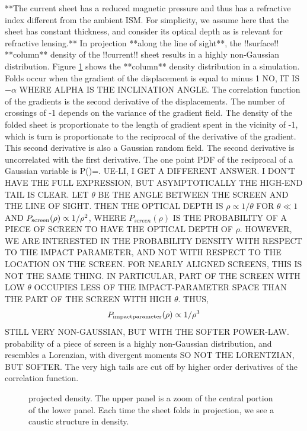 \documentclass[useAMS,usenatbib]{mn2e}
\begin{document}
**The current sheet has a reduced magnetic pressure and thus has a refractive index different
from the ambient ISM. For simplicity, we assume here that the sheet has constant thickness, and
consider its optical depth as is relevant for refractive lensing.**
In projection **along the line of sight**, the !!surface!! **column** density of the !!current!! sheet 
results in a highly non-Gaussian
distribution. Figure \ref{fig:rho} shows the **column** density distribution in a
simulation.  Folds occur when the gradient of the displacement is
equal to minus 1 NO, IT IS $-\alpha$ WHERE ALPHA IS THE INCLINATION ANGLE.  The correlation function of the gradients is the
second derivative of the displacements.  The number of crossings of -1
depends on the variance of the gradient field.  The density of the
folded sheet is proportionate to the length of gradient spent in the
vicinity of -1, which is turn is proportionate to the reciprocal of
the derivative of the gradient.  This second derivative is also a
Gaussian random field.  The second derivative is uncorrelated with the
first derivative.  The one point PDF of the reciprocal of a Gaussian
variable is
\beq
P(\rho)=.
\eeq
UE-LI, I GET A DIFFERENT ANSWER. I DON'T HAVE THE FULL EXPRESSION, BUT 
ASYMPTOTICALLY THE HIGH-END TAIL IS CLEAR. LET $\theta$ BE THE ANGLE BETWEEN THE 
SCREEN AND THE LINE OF SIGHT.  THEN THE OPTICAL DEPTH IS $\rho\propto1/\theta$ FOR
$\theta\ll 1$ AND $P_{\rm screen}(\rho)\propto 1/\rho^2$, WHERE $P_{screen}(\rho)$ IS THE PROBABILITY OF A PIECE OF SCREEN TO HAVE THE OPTICAL DEPTH OF $\rho$. HOWEVER, WE ARE INTERESTED
IN THE PROBABILITY DENSITY WITH RESPECT TO THE IMPACT PARAMETER, AND NOT WITH RESPECT TO
THE LOCATION ON THE SCREEN. FOR NEARLY ALIGNED SCREENS, THIS IS NOT THE SAME THING.
IN PARTICULAR, PART OF THE SCREEN WITH LOW $\theta$ OCCUPIES LESS OF THE IMPACT-PARAMETER
SPACE THAN THE PART OF THE SCREEN WITH HIGH $\theta$. THUS, 
\begin{equation}
P_{\rm impact parameter}(\rho)\propto 1/\rho^3
\label{eqn:prho}
\end{equation}
STILL VERY NON-GAUSSIAN, BUT WITH THE SOFTER POWER-LAW. 
probability of a piece of screen  is a highly non-Gaussian distribution, and resembles a Lorenzian,
with divergent moments SO NOT THE LORENTZIAN, BUT SOFTER.  The very
high tails are 
cut off by higher order derivatives of the correlation function.

\begin{figure}
\centerline{}
\caption{projected density.  The upper panel is a zoom of the central
  portion of the lower panel. Each time the sheet folds in projection,
we see a caustic structure in density.}
\label{fig:rho}
\end{figure}
\end{document}

